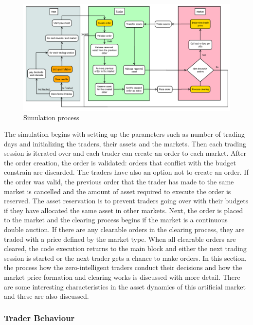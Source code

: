 \begin{figure}
    \includegraphics[width=\linewidth]{diagrams/placement_clearing_process.png}
    \caption{Simulation process}
    \label{fig:sim_proc}
\end{figure}

The simulation begins with setting up the parameters such as number of
trading days and initializing the traders, their assets and the markets.
Then each trading session is iterated over and each trader can create  
an order to each market. After the order creation, the order is validated: 
orders that conflict with the budget constrain are discarded.
The traders have also an option not to create an order. If the order was
valid, the previous order that the trader has made to the same market is cancelled 
and the amount of asset required to execute the order is reserved. The asset
reservation is to prevent traders going over with their budgets if they
have allocated the same asset in other markets. Next, the order is
placed to the market and the clearing process begins if the market is a 
continuous double auction. If there are any clearable orders in the clearing process,
they are traded with a price defined by the market type. When
all clearable orders are cleared, the code execution returns to the
main block and either the next trading session is started or the next
trader gets a chance to make orders. In this section, the process how the
zero-intelligent traders conduct their decisions and how the 
market price formation and clearing works is discussed with more detail.
There are some interesting characteristics in the asset dynamics of this
artificial market and these are also discussed.

\subsubsection{Trader Behaviour}

